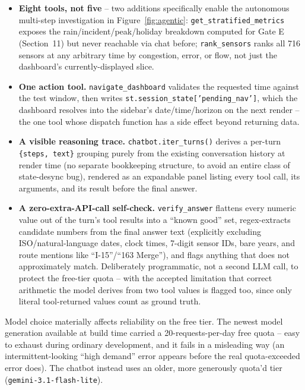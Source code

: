\documentclass[11pt]{article}
\newcommand{\code}[1]{\texttt{\small #1}}
\begin{document}
\begin{itemize}
\item \textbf{Eight tools, not five} -- two additions specifically enable the autonomous
  multi-step investigation in Figure~\ref{fig:agentic}: \code{get\_stratified\_metrics} exposes
  the rain/incident/peak/holiday breakdown computed for Gate E (Section~11) but never reachable
  via chat before; \code{rank\_sensors} ranks all 716 sensors at any arbitrary time by congestion,
  error, or flow, not just the dashboard's currently-displayed slice.
\item \textbf{One action tool.} \code{navigate\_dashboard} validates the requested time against
  the test window, then writes \code{st.session\_state['pending\_nav']}, which the dashboard
  resolves into the sidebar's date/time/horizon on the next render -- the one tool whose dispatch
  function has a side effect beyond returning data.
\item \textbf{A visible reasoning trace.} \code{chatbot.iter\_turns()} derives a per-turn
  \code{\{steps, text\}} grouping purely from the existing conversation history at render time (no
  separate bookkeeping structure, to avoid an entire class of state-desync bug), rendered as an
  expandable panel listing every tool call, its arguments, and its result before the final answer.
\item \textbf{A zero-extra-API-call self-check.} \code{verify\_answer} flattens every numeric
  value out of the turn's tool results into a ``known good'' set, regex-extracts candidate numbers
  from the final answer text (explicitly excluding ISO/natural-language dates, clock times,
  7-digit sensor IDs, bare years, and route mentions like ``I-15''/``163 Merge''), and flags
  anything that does not approximately match. Deliberately programmatic, not a second LLM call, to
  protect the free-tier quota -- with the accepted limitation that correct arithmetic the model
  derives from two tool values is flagged too, since only literal tool-returned values count as
  ground truth.
\end{itemize}

\begin{sowhat}
Model choice materially affects reliability on the free tier. The newest model generation
available at build time carried a 20-requests-per-day free quota -- easy to exhaust during
ordinary development, and it fails in a misleading way (an intermittent-looking ``high demand''
error appears before the real quota-exceeded error does). The chatbot instead uses an older, more
generously quota'd tier (\code{gemini-3.1-flash-lite}).
\end{sowhat}
\end{document}
